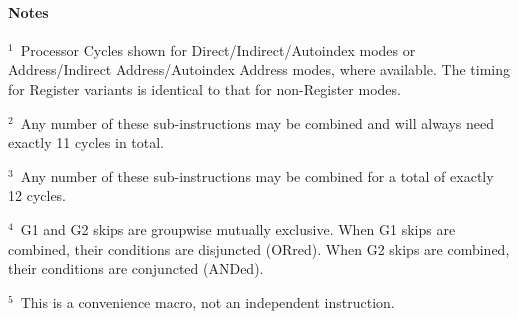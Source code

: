 {
  \newcommand\mk[1]{$^{#1}$}
  \newcommand\mka{\mk{1}}
  \newcommand\mkb{\mk{2}}
  \newcommand\mkc{\mk{3}}
  \newcommand\mkd{\mk{4}}
  \newcommand\mke{\mk{5}}
  {}

  \paragraph{Notes}

  \begin{description}
  \item \mka~Processor Cycles shown for Direct/Indirect/Autoindex modes or
    Address/Indirect Address/Autoindex Address modes, where available. The
    timing for Register variants is identical to that for non-Register
    modes. 
  \item \mkb~Any number of these sub-instructions may be combined and will
    always need exactly 11 cycles in total.
  \item \mkc~Any number of these sub-instructions may be combined for a total
    of exactly 12 cycles.
  \item \mkd~G1 and G2 skips are groupwise mutually exclusive. When G1 skips
    are combined, their conditions are disjuncted (ORred). When G2 skips are
    combined, their conditions are conjuncted (ANDed).
  \item \mke~This is a convenience macro, not an independent instruction.
  \end{description}

}


